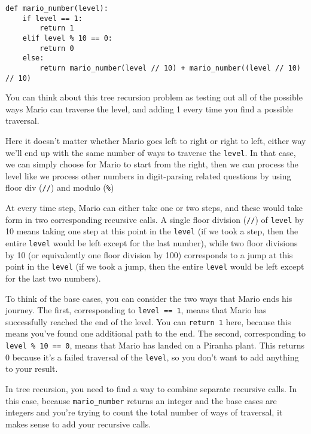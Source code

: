 \begin{blocksection}
\begin{solution}
\begin{lstlisting}
def mario_number(level):
    if level == 1:
        return 1
    elif level % 10 == 0:
        return 0
    else:
        return mario_number(level // 10) + mario_number((level // 10) // 10)
\end{lstlisting}
You can think about this tree recursion problem as testing out all of the possible ways Mario can traverse the level, and adding 1 every time you find a possible traversal.

Here it doesn’t matter whether Mario goes left to right or right to left, either way we’ll end up with the same number of ways to traverse the \lstinline{level}. In that case, we can simply choose for Mario to start from the right, then we can process the level like we process other numbers in digit-parsing related questions by using floor div (\lstinline{//}) and modulo (\lstinline{%})

At every time step, Mario can either take one or two steps, and these would take form in two corresponding recursive calls. A single floor division (\lstinline{//}) of \lstinline{level} by 10 means taking one step at this point in the \lstinline{level} (if we took a step, then the entire \lstinline{level} would be left except for the last number), while two floor divisions by 10 (or equivalently one floor division by 100) corresponds to a jump at this point in the \lstinline{level} (if we took a jump, then the entire \lstinline{level} would be left except for the last two numbers).

To think of the base cases, you can consider the two ways that Mario ends his journey. The first, corresponding to \lstinline{level == 1}, means that Mario has successfully reached the end of the level. You can \lstinline{return 1} here, because this means you’ve found one additional path to the end. The second, corresponding to \lstinline{level % 10 == 0}, means that Mario has landed on a Piranha plant. This returns 0 because it’s a failed traversal of the \lstinline{level}, so you don’t want to add anything to your result. 

In tree recursion, you need to find a way to combine separate recursive calls. In this case, because \lstinline{mario_number} returns an integer and the base cases are integers and you’re trying to count the total number of ways of traversal, it makes sense to add your recursive calls.

\end{solution}
\end{blocksection}


